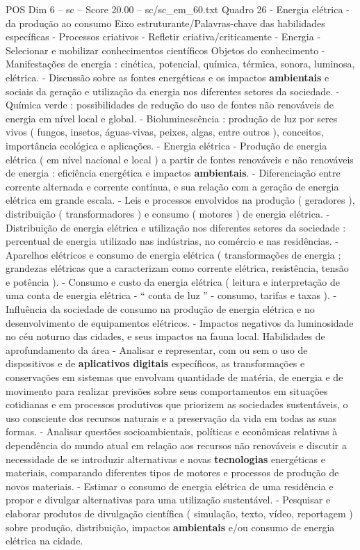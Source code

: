 \begin{textsample}{POS Dim 6 – sc – Score 20.00 – sc/sc\_em\_60.txt}
Quadro 26 - Energia elétrica - da produção ao consumo Eixo estruturante/Palavras-chave das habilidades específicas - Processos criativos - Refletir criativa/criticamente - Energia - Selecionar e mobilizar conhecimentos científicos Objetos do conhecimento - Manifestações de energia : cinética, potencial, química, térmica, sonora, luminosa, elétrica. - Discussão sobre as fontes energéticas e os impactos \textbf{ambientais} e sociais da geração e utilização da energia nos diferentes setores da sociedade. - Química verde : possibilidades de redução do uso de fontes não renováveis de energia em nível local e global. - Bioluminescência : produção de luz por seres vivos ( fungos, insetos, águas-vivas, peixes, algas, entre outros ), conceitos, importância ecológica e aplicações. - Energia elétrica - Produção de energia elétrica ( em nível nacional e local ) a partir de fontes renováveis e não renováveis de energia : eficiência energética e impactos \textbf{ambientais}. - Diferenciação entre corrente alternada e corrente contínua, e sua relação com a geração de energia elétrica em grande escala. - Leis e processos envolvidos na produção ( geradores ), distribuição ( transformadores ) e consumo ( motores ) de energia elétrica. - Distribuição de energia elétrica e utilização nos diferentes setores da sociedade : percentual de energia utilizado nas indústrias, no comércio e nas residências. - Aparelhos elétricos e consumo de energia elétrica ( transformações de energia ; grandezas elétricas que a caracterizam como corrente elétrica, resistência, tensão e potência ). - Consumo e custo da energia elétrica ( leitura e interpretação de uma conta de energia elétrica - “ conta de luz ” - consumo, tarifas e taxas ). - Influência da sociedade de consumo na produção de energia elétrica e no desenvolvimento de equipamentos elétricos. - Impactos negativos da luminosidade no céu noturno das cidades, e seus impactos na fauna local.
Habilidades de aprofundamento da área - Analisar e representar, com ou sem o uso de dispositivos e de \textbf{aplicativos} \textbf{digitais} específicos, as transformações e conservações em sistemas que envolvam quantidade de matéria, de energia e de movimento para realizar previsões sobre seus comportamentos em situações cotidianas e em processos produtivos que priorizem as sociedades sustentáveis, o uso consciente dos recursos naturais e a preservação da vida em todas as suas formas. - Analisar questões socioambientais, políticas e econômicas relativas à dependência do mundo atual em relação aos recursos não renováveis e discutir a necessidade de se introduzir alternativas e novas \textbf{tecnologias} energéticas e materiais, comparando diferentes tipos de motores e processos de produção de novos materiais. - Estimar o consumo de energia elétrica de uma residência e propor e divulgar alternativas para uma utilização sustentável. - Pesquisar e elaborar produtos de divulgação científica ( simulação, texto, vídeo, reportagem ) sobre produção, distribuição, impactos \textbf{ambientais} e/ou consumo de energia elétrica na cidade.

\end{textsample}
